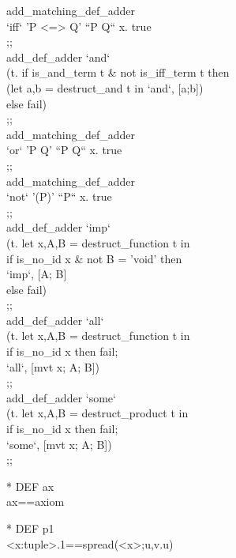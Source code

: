 \begin{prl*}
\>  add\_matching\_def\_adder\\
\>    `iff` 'P <=> Q' ``P Q`` \mlambda{}x. true\\
\>  ;;\\
\>  add\_def\_adder `and` \\
\>    (\mbackslash{}t. if is\_and\_term t \& not is\_iff\_term t then\\
\>           (let a,b = destruct\_and t in `and`, [a;b])\\
\>         else fail)\\
\>  ;;\\
\>  add\_matching\_def\_adder\\
\>    `or` 'P \mvee{} Q' ``P Q`` \mlambda{}x. true\\
\>  ;;\\
\>  add\_matching\_def\_adder\\
\>    `not` '\mneg{}(P)' ``P`` \mlambda{}x. true\\
\>  ;;\\
\>  add\_def\_adder `imp`\\
\>    (\mbackslash{}t. let x,A,B = destruct\_function t in \\
\>         if is\_no\_id x \& not B = 'void' then \\
\>           `imp`, [A; B]\\
\>         else fail)\\
\>  ;;\\
\>  add\_def\_adder `all` \\
\>    (\mbackslash{}t. let x,A,B = destruct\_function t in \\
\>         if is\_no\_id x then fail;\\
\>         `all`, [mvt x; A; B])\\
\>  ;;\\
\>  add\_def\_adder `some` \\
\>    (\mbackslash{}t. let x,A,B = destruct\_product t in \\
\>         if is\_no\_id x then fail;\\
\>         `some`, [mvt x; A; B])\\
\>  ;;
\end{prl*}

\begin{prl*}
\>* DEF ax\\
\>  ax==axiom
\end{prl*}

\begin{prl*}
\>* DEF p1\\
\>  <x:tuple>.1==spread(<x>;u,v.u)
\end{prl*}

